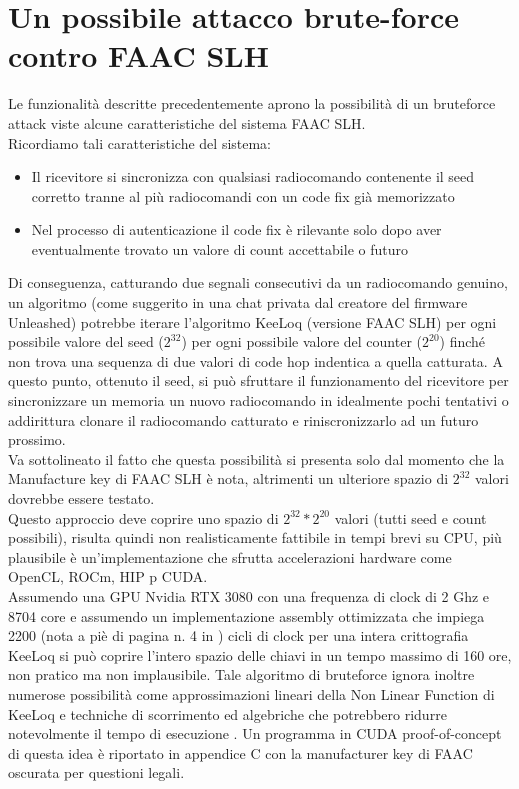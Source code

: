 \section{Un possibile attacco brute-force contro FAAC SLH}
\label{sec:attack}

Le funzionalità descritte precedentemente aprono la possibilità di un bruteforce attack viste alcune caratteristiche del sistema FAAC SLH.\\
Ricordiamo tali caratteristiche del sistema:
\begin{itemize}
  \item Il ricevitore si sincronizza con qualsiasi radiocomando contenente il seed corretto tranne al più radiocomandi con un code fix già memorizzato
  \item Nel processo di autenticazione il code fix è rilevante solo dopo aver eventualmente trovato un valore di count accettabile o futuro
\end{itemize}
Di conseguenza, catturando due segnali consecutivi da un radiocomando genuino, un algoritmo (come suggerito in una chat privata dal creatore del firmware Unleashed) potrebbe iterare l’algoritmo KeeLoq (versione FAAC SLH) per ogni possibile valore del seed ($2^{32}$) per ogni possibile valore del counter ($2^{20}$) finché non trova una sequenza di due valori di code hop indentica a quella catturata. A questo punto, ottenuto il seed, si può sfruttare il funzionamento del ricevitore per sincronizzare un memoria un nuovo radiocomando in idealmente pochi tentativi o addirittura clonare il radiocomando catturato e riniscronizzarlo ad un futuro prossimo.\\
Va sottolineato il fatto che questa possibilità si presenta solo dal momento che la Manufacture key di FAAC SLH è nota, altrimenti un ulteriore spazio di $2^{32}$ valori dovrebbe essere testato.\\
Questo approccio deve coprire uno spazio di $2^{32} * 2^{20}$ valori (tutti seed e count possibili), risulta quindi non realisticamente fattibile in tempi brevi su CPU, più plausibile è un’implementazione che sfrutta accelerazioni hardware come OpenCL, ROCm, HIP p CUDA.\\
Assumendo una GPU Nvidia RTX 3080 con una frequenza di clock di 2 Ghz e 8704 core e assumendo un implementazione assembly ottimizzata che impiega 2200 (nota a piè di pagina n. 4 in \cite{cryptoeprint}) cicli di clock per una intera crittografia KeeLoq si può coprire l’intero spazio delle chiavi in un tempo massimo di 160 ore, non pratico ma non implausibile. Tale algoritmo di bruteforce ignora inoltre numerose possibilità come approssimazioni lineari della Non Linear Function di KeeLoq e techniche di scorrimento ed algebriche che potrebbero ridurre notevolmente il tempo di esecuzione \cite{cryptoeprint,algebraic_slide,attack,periodic_ciphers}.
Un programma in CUDA proof-of-concept di questa idea è riportato in appendice C con la manufacturer key di FAAC oscurata per questioni legali.
